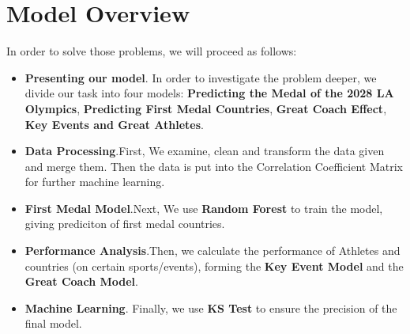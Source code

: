 \section*{Model Overview}


In order to solve those problems, we will proceed as follows:

\begin{itemize}
    \begin{figure}[htbp]
        \centering
        \texttt{[image: ./figures/figure1\_work\_flow.png]}
        \caption{Flow chart of our work}
        \label{fig:example}
    \end{figure}
    
\item {\bf Presenting our model}. In order to investigate the problem deeper, we divide our task into four models: \textbf{Predicting the Medal of the 2028 LA Olympics}, \textbf{Predicting First Medal Countries}, \textbf{Great Coach Effect}, \textbf{Key Events and Great Athletes}.

\item {\bf Data Processing}.First, We examine, clean and transform the data given and merge them. Then the data is put into the Correlation Coefficient Matrix for further machine learning.

\item {\bf First Medal Model}.Next, We use \textbf{Random Forest} to train the model, giving prediciton of first medal countries.

\item{\bf Performance Analysis}.Then, we calculate the performance of Athletes and countries (on certain sports/events), forming the \textbf{Key Event Model} and the \textbf{Great Coach Model}.

\item {\bf Machine Learning}. Finally, we use \textbf{KS Test} to ensure the precision of the final model.
\end{itemize}
